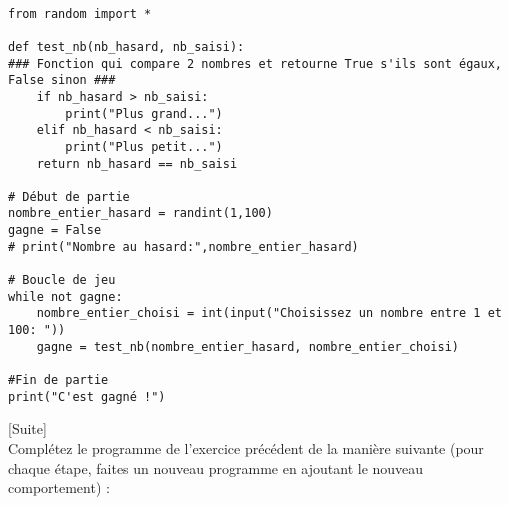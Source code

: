 \documentclass[a4paper,12pt]{article}
\begin{document}
\begin{correction}
		~\\ \vspace{-5pt}
	\begin{lstlisting}
from random import *

def test_nb(nb_hasard, nb_saisi):
### Fonction qui compare 2 nombres et retourne True s'ils sont égaux, False sinon ###
    if nb_hasard > nb_saisi:
        print("Plus grand...")
    elif nb_hasard < nb_saisi:
        print("Plus petit...")
    return nb_hasard == nb_saisi

# Début de partie
nombre_entier_hasard = randint(1,100)
gagne = False
# print("Nombre au hasard:",nombre_entier_hasard)

# Boucle de jeu
while not gagne:
    nombre_entier_choisi = int(input("Choisissez un nombre entre 1 et 100: "))
    gagne = test_nb(nombre_entier_hasard, nombre_entier_choisi)

#Fin de partie
print("C'est gagné !")
\end{lstlisting}
\hfill
	\end{correction}
\finexo
\exo{}[Suite]  ~\\ 
Complétez le programme de l'exercice précédent de la manière suivante (pour chaque étape, faites un nouveau programme en ajoutant le nouveau comportement) :
\end{document}
